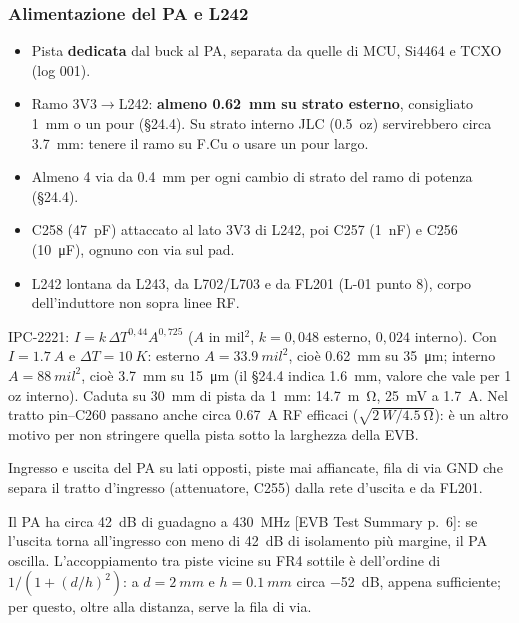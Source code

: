\documentclass[a4paper,10pt]{article}
\newcommand{\fonte}[1]{{\footnotesize\color{sbgray}[#1]}}
\newcounter{regola}
\begin{document}
\subsubsection{Alimentazione del PA e L242}
\begin{regola}[3V3 del PA]
\begin{itemize}
\item Pista \textbf{dedicata} dal buck al PA, separata da quelle di MCU, Si4464 e TCXO (log 001).
\item Ramo 3V3$\rightarrow$L242: \textbf{almeno \SI{0.62}{mm} su strato esterno}, consigliato \SI{1}{mm} o
      un pour (\S24.4). Su strato interno JLC (\SI{0.5}{oz}) servirebbero circa \SI{3.7}{mm}: tenere il
      ramo su F.Cu o usare un pour largo.
\item Almeno 4 via da \SI{0.4}{mm} per ogni cambio di strato del ramo di potenza (\S24.4).
\item C258 (\SI{47}{pF}) attaccato al lato 3V3 di L242, poi C257 (\SI{1}{nF}) e C256 (\SI{10}{\micro F}),
      ognuno con via sul pad.
\item L242 lontana da L243, da L702/L703 e da FL201 (L-01 punto 8), corpo dell'induttore non sopra linee RF.
\end{itemize}
\end{regola}

\begin{perche}
IPC-2221: $I=k\,\Delta T^{0{,}44}A^{0{,}725}$ ($A$ in mil$^2$, $k=0{,}048$ esterno, $0{,}024$ interno). Con
$I=\SI{1.7}{A}$ e $\Delta T=\SI{10}{K}$: esterno $A=\SI{33.9}{mil^2}$, cioè \SI{0.62}{mm} su
\SI{35}{\micro m}; interno $A=\SI{88}{mil^2}$, cioè \SI{3.7}{mm} su \SI{15}{\micro m} (il \S24.4 indica
\SI{1.6}{mm}, valore che vale per 1 oz interno). Caduta su \SI{30}{mm} di pista da \SI{1}{mm}:
\SI{14.7}{m\ohm}, \SI{25}{mV} a \SI{1.7}{A}. Nel tratto pin--C260 passano anche circa \SI{0.67}{A} RF efficaci
($\sqrt{\SI{2}{W}/\SI{4.5}{\ohm}}$): è un altro motivo per non stringere quella pista sotto la larghezza
della EVB.
\end{perche}

\begin{regola}
Ingresso e uscita del PA su lati opposti, piste mai affiancate, fila di via GND che separa il tratto
d'ingresso (attenuatore, C255) dalla rete d'uscita e da FL201.
\end{regola}

\begin{perche}
Il PA ha circa \SI{42}{dB} di guadagno a \SI{430}{MHz} \fonte{EVB Test Summary p.~6}: se l'uscita torna
all'ingresso con meno di \SI{42}{dB} di isolamento più margine, il PA oscilla. L'accoppiamento tra piste
vicine su FR4 sottile è dell'ordine di $1/(1+(d/h)^2)$: a $d=\SI{2}{mm}$ e $h=\SI{0.1}{mm}$ circa
\SI{-52}{dB}, appena sufficiente; per questo, oltre alla distanza, serve la fila di via.
\end{perche}
\end{document}
